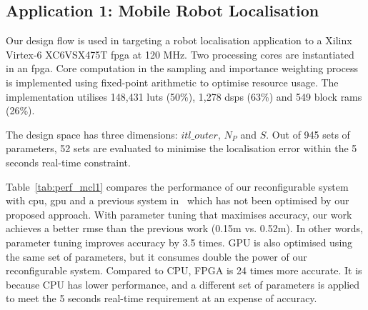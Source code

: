 

\subsection{Application 1: Mobile Robot Localisation}

Our design flow is used in targeting a robot localisation application to a Xilinx Virtex-6 XC6VSX475T \gls{fpga} at 120 MHz.
Two processing cores are instantiated in an \gls{fpga}.
Core computation in the sampling and importance weighting process is implemented using fixed-point arithmetic to optimise resource usage.
The implementation utilises 148,431 \glspl{lut} (50\%), 1,278 \glspl{dsp} (63\%) and 549 block \glspl{ram} (26\%).

The design space has three dimensions: $itl\_outer$, $N_P$ and $S$.
Out of 945 sets of parameters, 52 sets are evaluated to minimise the localisation error within the 5 seconds real-time constraint.

Table~\ref{tab:perf_mcl1} compares the performance of our reconfigurable system with \gls{cpu}, \gls{gpu} and a previous system in~\cite{chau14trets} 
which has not been optimised by our proposed approach.
With parameter tuning that maximises accuracy, our work achieves a better \gls{rmse} than the previous work (0.15m vs. 0.52m).
In other words, parameter tuning improves accuracy by 3.5 times.
GPU is also optimised using the same set of parameters, but it consumes double the power of our reconfigurable system.
Compared to CPU, FPGA is 24 times more accurate.
It is because CPU has lower performance, and a different set of parameters is applied to meet the 5 seconds real-time requirement at an expense of accuracy.

